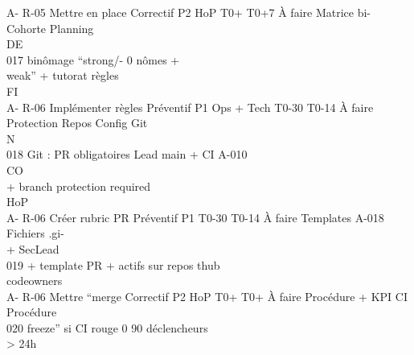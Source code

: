 \documentclass[12pt,landscape,a4paper]{article}
\begin{document}
A- R-05    Mettre en place       Correctif P2    HoP          T0+ T0+7 À faire      Matrice bi-    Cohorte     Planning\\
\vspace{0.5em}
\vspace{0.5em}
\vspace{0.5em}
\vspace{0.5em}
DE\\
017        binômage “strong/-                                 0                     nômes +\\
weak” + tutorat                                                          règles\\
\vspace{0.5em}
\vspace{0.5em}
\vspace{0.5em}
\vspace{0.5em}
FI\\
A- R-06    Implémenter règles Préventif P1       Ops + Tech   T0-30 T0-14 À faire   Protection     Repos       Config Git\\
\vspace{0.5em}
\vspace{0.5em}
\vspace{0.5em}
\vspace{0.5em}
N\\
018        Git : PR obligatoires                 Lead                               main + CI      A-010\\
\vspace{0.5em}
\vspace{0.5em}
CO\\
+ branch protection                                                      required\\
HoP\\
A- R-06    Créer rubric PR       Préventif P1                 T0-30 T0-14 À faire   Templates        A-018     Fichiers .gi-\\
+ SecLead\\
019        + template PR +                                                          actifs sur repos           thub\\
codeowners\\
A- R-06    Mettre “merge         Correctif P2    HoP          T0+ T0+     À faire   Procédure +     KPI CI     Procédure\\
020        freeze” si CI rouge                                0   90                déclencheurs\\
\textgreater{} 24h\\
\end{document}
